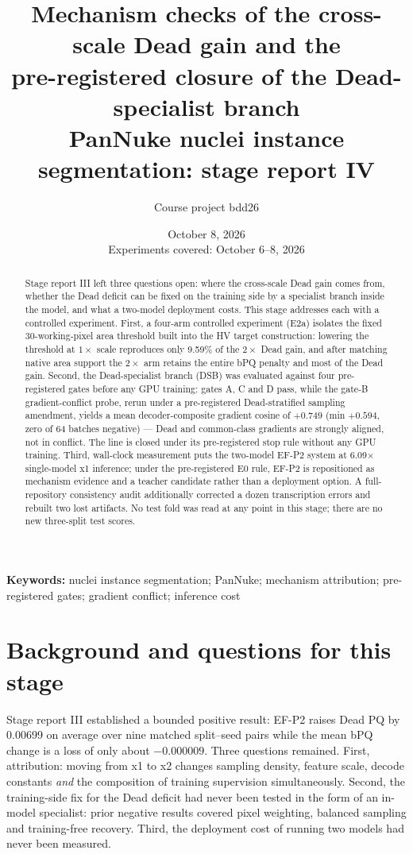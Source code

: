 \documentclass[11pt,a4paper]{article}
\title{\bfseries Mechanism checks of the cross-scale Dead gain and the\\pre-registered closure of the Dead-specialist branch\\[7pt]
\large PanNuke nuclei instance segmentation: stage report IV}
\author{Course project bdd26}
\date{October 8, 2026\\\small Experiments covered: October 6--8, 2026}
\begin{document}
\maketitle

\begin{abstract}
Stage report III left three questions open: where the cross-scale Dead gain comes from, whether the Dead deficit can be fixed on the training side by a specialist branch inside the model, and what a two-model deployment costs. This stage addresses each with a controlled experiment. First, a four-arm controlled experiment (E2a) isolates the fixed 30-working-pixel area threshold built into the HV target construction: lowering the threshold at $1\times$ scale reproduces only 9.59\% of the $2\times$ Dead gain, and after matching native area support the $2\times$ arm retains the entire bPQ penalty and most of the Dead gain. Second, the Dead-specialist branch (DSB) was evaluated against four pre-registered gates before any GPU training: gates A, C and D pass, while the gate-B gradient-conflict probe, rerun under a pre-registered Dead-stratified sampling amendment, yields a mean decoder-composite gradient cosine of $+0.749$ (min $+0.594$, zero of 64 batches negative) --- Dead and common-class gradients are strongly aligned, not in conflict. The line is closed under its pre-registered stop rule without any GPU training. Third, wall-clock measurement puts the two-model EF-P2 system at 6.09$\times$ single-model x1 inference; under the pre-registered E0 rule, EF-P2 is repositioned as mechanism evidence and a teacher candidate rather than a deployment option. A full-repository consistency audit additionally corrected a dozen transcription errors and rebuilt two lost artifacts. No test fold was read at any point in this stage; there are no new three-split test scores.
\end{abstract}
\noindent\textbf{Keywords:} nuclei instance segmentation; PanNuke; mechanism attribution; pre-registered gates; gradient conflict; inference cost

\section{Background and questions for this stage}

Stage report III established a bounded positive result: EF-P2 raises Dead PQ by 0.00699 on average over nine matched split--seed pairs while the mean bPQ change is a loss of only about $-0.000009$\cite{reports}. Three questions remained. First, attribution: moving from x1 to x2 changes sampling density, feature scale, decode constants \emph{and} the composition of training supervision simultaneously. Second, the training-side fix for the Dead deficit had never been tested in the form of an in-model specialist: prior negative results covered pixel weighting, balanced sampling and training-free recovery. Third, the deployment cost of running two models had never been measured.
\end{document}

